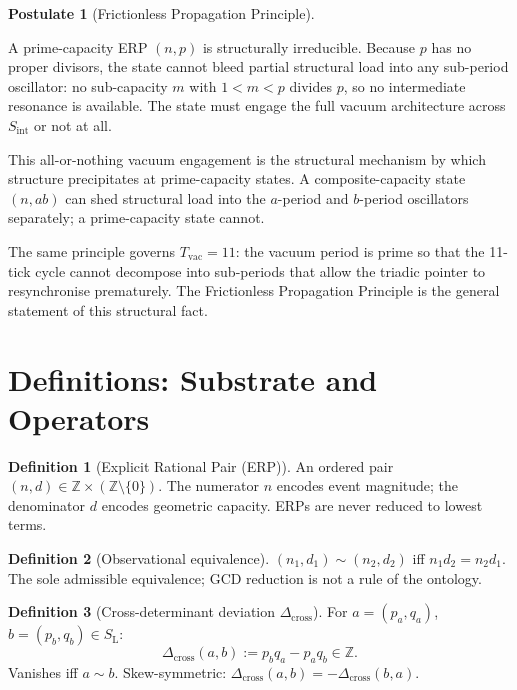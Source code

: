 \documentclass[11pt, letterpaper]{article}
\newcommand{\Z}{\mathbb{Z}}
\newcommand{\SL}{S_{\mathrm{L}}}
\newcommand{\Dcross}{\Delta_{\mathrm{cross}}}
\newcommand{\Sint}{S_{\mathrm{int}}}
\theoremstyle{definition}
\newtheorem{definition}{Definition}[section]
\newtheorem{postulate}{Postulate}[section]
\theoremstyle{plain}
\begin{document}
\begin{postulate}[Frictionless Propagation Principle]\label{post:frictionless}
\begin{rsbox}
A prime-capacity ERP $(n,p)$ is structurally irreducible.  Because
$p$ has no proper divisors, the state cannot bleed partial structural load
into any sub-period oscillator: no sub-capacity $m$ with $1<m<p$ divides $p$,
so no intermediate resonance is available.  The state must engage the full
vacuum architecture across $\Sint$ or not at all.

This all-or-nothing vacuum engagement is the structural mechanism by which
structure precipitates at prime-capacity states.  A composite-capacity state
$(n,ab)$ can shed structural load into the $a$-period and $b$-period
oscillators separately; a prime-capacity state cannot.

The same principle governs $T_{\mathrm{vac}}=11$: the vacuum period is prime
so that the 11-tick cycle cannot decompose into sub-periods that allow the
triadic pointer to resynchronise prematurely.  The Frictionless Propagation
Principle is the general statement of this structural fact.
\end{rsbox}
\end{postulate}

\newpage


\section{Definitions: Substrate and Operators}\label{sec:defs}

\begin{definition}[Explicit Rational Pair (ERP)]\label{def:ERP}
An ordered pair $(n,d)\in\Z\times(\Z\setminus\{0\})$.  The numerator $n$
encodes event magnitude; the denominator $d$ encodes geometric capacity.
ERPs are never reduced to lowest terms.
\end{definition}

\begin{definition}[Observational equivalence]\label{def:obs-equiv}
$(n_1,d_1)\sim(n_2,d_2)$ iff $n_1 d_2=n_2 d_1$.  The sole admissible
equivalence; GCD reduction is not a rule of the ontology.
\end{definition}

\begin{definition}[Cross-determinant deviation $\Dcross$]\label{def:Dcross}
For $a=(p_a,q_a)$, $b=(p_b,q_b)\in\SL$:
\[
\Dcross(a,b):=p_b q_a-p_a q_b\in\Z.
\]
Vanishes iff $a\sim b$.  Skew-symmetric: $\Dcross(a,b)=-\Dcross(b,a)$.
\end{definition}
\end{document}
